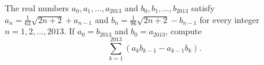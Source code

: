 The real numbers $a_0, a_1, \dots, a_{2013}$ and $b_0, b_1, \dots, b_{2013}$ satisfy $a_{n} = \frac{1}{63} \sqrt{2n+2} + a_{n-1}$ and $b_{n} = \frac{1}{96} \sqrt{2n+2} - b_{n-1}$ for every integer $n = 1, 2, \dots, 2013$.  If $a_0 = b_{2013}$ and $b_0 = a_{2013}$, compute \[ \sum_{k=1}^{2013} \left( a_kb_{k-1} - a_{k-1}b_k \right). \]
